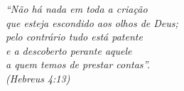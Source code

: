 \documentclass[
	11pt,				%
	openright,			%
	twoside,			%
	a4paper,			%
	english,			%
	french,				%
	spanish,			%
	brazil				%
	]{abntex2}          %
\begin{document}

%

%

%
\begin{epigrafe}
    \vspace*{\fill}
	\begin{flushright}
		\textit{``Não há nada em toda a criação \\
			que esteja escondido aos olhos de Deus; \\
			pelo contrário tudo está patente \\ e a descoberto perante aquele \\ a quem temos de prestar contas''. \\
			(Hebreus 4:13)}
	\end{flushright}
\end{epigrafe}
%
\setlength{\absparsep}{18pt} %

%
\listoffigures*
\cleardoublepage
%
\listoftables*
\cleardoublepage
%




\tableofcontents*
\cleardoublepage
\end{document}
